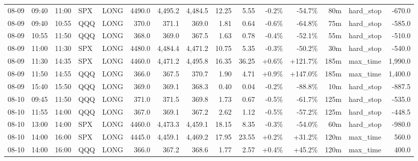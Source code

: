 \documentclass[11pt,a4paper,twoside]{article}
\begin{document}
\begin{landscape}
\begin{center}
\begin{longtable}{>{\color{txtmain}}l l l l l r r r r r r r r >{\color{txtmain}}l r}
08-09 & 09:40 & 11:00 & SPX & LONG & 4490.0 & 4,495.2 & 4,484.5 & 12.25 & 5.55 & \textcolor{lossred}{-0.2\%} & \textcolor{lossred}{-54.7\%} & 80m & hard\_stop & \textcolor{lossred}{-670.0} \\
08-09 & 09:40 & 10:55 & QQQ & LONG & 370.0 & 371.1 & 369.0 & 1.81 & 0.64 & \textcolor{lossred}{-0.6\%} & \textcolor{lossred}{-64.8\%} & 75m & hard\_stop & \textcolor{lossred}{-585.0} \\
08-09 & 10:55 & 11:50 & QQQ & LONG & 368.0 & 369.0 & 367.5 & 1.63 & 0.78 & \textcolor{lossred}{-0.4\%} & \textcolor{lossred}{-52.1\%} & 55m & hard\_stop & \textcolor{lossred}{-510.0} \\
08-09 & 11:00 & 11:30 & SPX & LONG & 4480.0 & 4,484.4 & 4,471.2 & 10.75 & 5.35 & \textcolor{lossred}{-0.3\%} & \textcolor{lossred}{-50.2\%} & 30m & hard\_stop & \textcolor{lossred}{-540.0} \\
08-09 & 11:30 & 14:35 & SPX & LONG & 4460.0 & 4,471.2 & 4,495.8 & 16.35 & 36.25 & \textcolor{wingreen}{+0.6\%} & \textcolor{wingreen}{+121.7\%} & 185m & max\_time & \textcolor{wingreen}{1,990.0} \\
08-09 & 11:50 & 14:55 & QQQ & LONG & 366.0 & 367.5 & 370.7 & 1.90 & 4.71 & \textcolor{wingreen}{+0.9\%} & \textcolor{wingreen}{+147.0\%} & 185m & max\_time & \textcolor{wingreen}{1,400.0} \\
08-09 & 15:40 & 15:50 & QQQ & LONG & 369.0 & 369.1 & 368.3 & 0.40 & 0.04 & \textcolor{lossred}{-0.2\%} & \textcolor{lossred}{-88.8\%} & 10m & hard\_stop & \textcolor{lossred}{-887.5} \\
08-10 & 09:45 & 11:50 & QQQ & LONG & 371.0 & 371.5 & 369.8 & 1.73 & 0.67 & \textcolor{lossred}{-0.5\%} & \textcolor{lossred}{-61.7\%} & 125m & hard\_stop & \textcolor{lossred}{-535.0} \\
08-10 & 11:55 & 14:00 & QQQ & LONG & 367.0 & 369.1 & 367.2 & 2.62 & 1.12 & \textcolor{lossred}{-0.5\%} & \textcolor{lossred}{-57.2\%} & 125m & hard\_stop & \textcolor{lossred}{-448.5} \\
08-10 & 13:00 & 14:00 & SPX & LONG & 4460.0 & 4,473.3 & 4,459.1 & 18.15 & 8.35 & \textcolor{lossred}{-0.3\%} & \textcolor{lossred}{-54.0\%} & 60m & hard\_stop & \textcolor{lossred}{-980.0} \\
08-10 & 14:00 & 16:00 & SPX & LONG & 4445.0 & 4,459.1 & 4,469.2 & 17.95 & 23.55 & \textcolor{wingreen}{+0.2\%} & \textcolor{wingreen}{+31.2\%} & 120m & max\_time & \textcolor{wingreen}{560.0} \\
08-10 & 14:00 & 16:00 & QQQ & LONG & 366.0 & 367.2 & 368.6 & 1.77 & 2.57 & \textcolor{wingreen}{+0.4\%} & \textcolor{wingreen}{+45.2\%} & 120m & max\_time & \textcolor{wingreen}{400.0} \\

\end{longtable}
\end{center}
\end{landscape}
\end{document}
